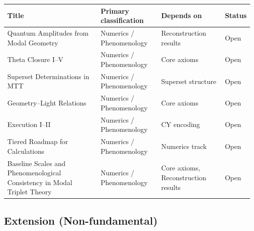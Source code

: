 \documentclass[11pt]{article}
\begin{document}
\begin{center}
\small
\begin{tabular}{|p{7.2cm}|p{3.6cm}|p{3.6cm}|p{1.6cm}|}
\hline
\textbf{Title} & \textbf{Primary classification} & \textbf{Depends on} & \textbf{Status}\\
\hline
Quantum Amplitudes from Modal Geometry
& Numerics / Phenomenology & Reconstruction results & Open\\
\hline
Theta Closure I--V
& Numerics / Phenomenology & Core axioms & Open\\
\hline
Superset Determinations in MTT
& Numerics / Phenomenology & Superset structure & Open\\
\hline
Geometry--Light Relations
& Numerics / Phenomenology & Core axioms & Open\\
\hline
Execution I--II
& Numerics / Phenomenology & CY encoding & Open\\
\hline
Tiered Roadmap for Calculations
& Numerics / Phenomenology & Numerics track & Open\\
\hline
Baseline Scales and Phenomenological Consistency in Modal Triplet Theory
& Numerics / Phenomenology
& Core axioms, Reconstruction results
& Open\\
\hline
\end{tabular}
\end{center}

\subsection{Extension (Non-fundamental)}
\end{document}
